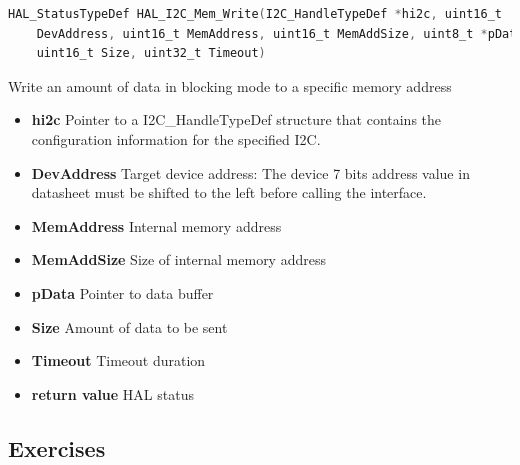 \documentclass[english]{article}
\begin{document}
\begin{lstlisting}[language=C, caption={Writing Register values}, label={lst:write} ]
HAL_StatusTypeDef HAL_I2C_Mem_Write(I2C_HandleTypeDef *hi2c, uint16_t
    DevAddress, uint16_t MemAddress, uint16_t MemAddSize, uint8_t *pData,
    uint16_t Size, uint32_t Timeout)
\end{lstlisting}
Write an amount of data in blocking mode to a specific memory address
\begin{itemize}
    \item \textbf{hi2c} Pointer to a I2C\_HandleTypeDef structure that contains the configuration information
        for the specified I2C.
        \item \textbf{DevAddress} Target device address: The device 7 bits address value in datasheet must be
        shifted to the left before calling the interface.
        \item \textbf{MemAddress} Internal memory address
        \item \textbf{MemAddSize} Size of internal memory address
        \item \textbf{pData} Pointer to data buffer
        \item \textbf{Size} Amount of data to be sent
        \item \textbf{Timeout} Timeout duration 
        \item \textbf{return value} HAL status
\end{itemize}

\newpage
\subsection{Exercises}
\end{document}
